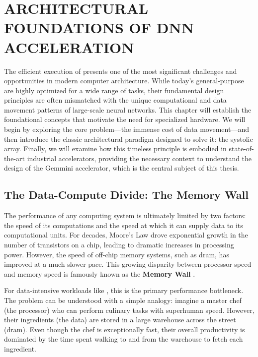 \chapter{ARCHITECTURAL FOUNDATIONS OF DNN ACCELERATION}
\label{chap:dnn_foundations}

The efficient execution of  presents one of the most significant challenges and opportunities in modern computer architecture. While today's general-purpose  are highly optimized for a wide range of tasks, their fundamental design principles are often mismatched with the unique computational and data movement patterns of large-scale neural networks. This chapter will establish the foundational concepts that motivate the need for specialized hardware. We will begin by exploring the core problem---the immense cost of data movement---and then introduce the classic architectural paradigm designed to solve it: the systolic array. Finally, we will examine how this timeless principle is embodied in state-of-the-art industrial accelerators, providing the necessary context to understand the design of the Gemmini accelerator, which is the central subject of this thesis.

\section{The Data-Compute Divide: The Memory Wall}
\label{sec:memory_wall}

The performance of any computing system is ultimately limited by two factors: the speed of its computations and the speed at which it can supply data to its computational units. For decades, Moore's Law drove exponential growth in the number of transistors on a chip, leading to dramatic increases in processing power. However, the speed of off-chip memory systems, such as \acrshort{dram}, has improved at a much slower pace. This growing disparity between processor speed and memory speed is famously known as the \textbf{Memory Wall} \cite{wulf1995hitting}.

For data-intensive workloads like , this is the primary performance bottleneck. The problem can be understood with a simple analogy: imagine a master chef (the processor) who can perform culinary tasks with superhuman speed. However, their ingredients (the data) are stored in a large warehouse across the street (\acrshort{dram}). Even though the chef is exceptionally fast, their overall productivity is dominated by the time spent walking to and from the warehouse to fetch each ingredient.

